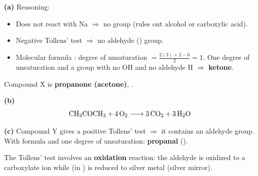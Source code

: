 \documentclass[addpoints]{exam}
\begin{document}
\begin{questions}
\begin{solution}[9cm]
\textbf{(a)} Reasoning:
\begin{itemize}
    \item Does not react with Na $\Rightarrow$ no  group (rules out alcohol or
    carboxylic acid).
    \item Negative Tollens' test $\Rightarrow$ no aldehyde () group.
    \item Molecular formula : degree of unsaturation $= \frac{2(3)+2-6}{2} = 1$.
    One degree of unsaturation and a  group with no OH and no aldehyde H $\Rightarrow$
    \textbf{ketone}.
\end{itemize}
Compound X is \textbf{propanone (acetone)}, .

\textbf{(b)}
\[
\ce{CH3COCH3 + 4O2 -> 3CO2 + 3H2O}
\]

\textbf{(c)} Compound Y gives a positive Tollens' test $\Rightarrow$ it contains an aldehyde
group. With formula  and one degree of unsaturation: \textbf{propanal}
().

The Tollens' test involves an \textbf{oxidation} reaction: the aldehyde is oxidized to a
carboxylate ion while  (in \ce{[Ag(NH3)2]+}) is reduced to silver metal (silver mirror).
\end{solution}

\end{questions}
\end{document}
